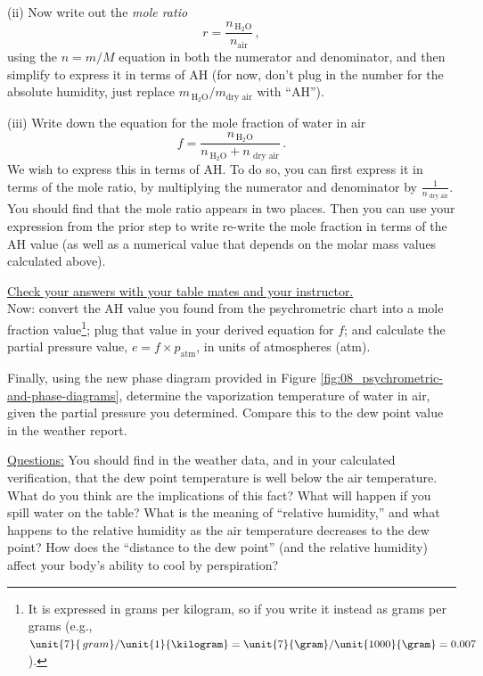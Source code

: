 \answerspace[6cm]

\noindent (ii) Now write out the {\em mole ratio}
	\begin{equation*}
	r = \frac{n_{\, \text{H}_2\text{O}}}{n_\text{air}} \, ,
	\end{equation*}
using the $n = m/M$ equation in both the numerator and denominator, and then simplify to express it in terms of AH (for now, don't plug in the number for the absolute humidity, just replace $m_{\, \text{H}_2\text{O}} / m_\text{dry air}$ with ``AH'').

\answerspace[6cm]

\noindent (iii) Write down the equation for the mole fraction of water in air
	\begin{equation*}
	f =  \frac{n_{\, \text{H}_2\text{O}}}{n_{\, \text{H}_2\text{O}} + n_\text{ dry air}} \,.
	\end{equation*}
We wish to express this in terms of AH.  To do so, you can first express it in terms of the mole ratio, by multiplying the numerator and denominator by $\frac{1}{n_\text{ dry air}}$. You should find that the mole ratio appears in two places.  Then you can use your expression from the prior step to write re-write the mole fraction in terms of the AH value (as well as a numerical value that depends on the molar mass values calculated above).

\answerspace[5cm]

\noindent \underline{Check your answers with your table mates and your instructor.} \\[-6pt]

\noindent Now: convert the AH value you found from the psychrometric chart into a mole fraction value\footnote{It is expressed in grams per kilogram, so if you write it instead as grams per grams (e.g., $\unit{7}{\,gram} / \unit{1}{\kilogram} = \unit{7}{\gram} / \unit{1000}{\gram} = 0.007$).}; plug that value in your derived equation for $f$; and calculate the partial pressure value, $e = f \times p_\text{atm}$, in units of atmospheres (atm).

\answerspace[4cm]

\noindent Finally, using the new phase diagram provided in Figure \ref{fig:08_psychrometric-and-phase-diagrams}, determine the vaporization temperature of water in air, given the partial pressure you determined.  Compare this to the dew point value in the weather report.

\answerspace[3cm]

\noindent  \underline{Questions:} You should find in the weather data, and in your calculated verification, that the dew point temperature is well below the air temperature.  What do you think are the implications of this fact?  What will happen if you spill water on the table?  What is the meaning of ``relative humidity,'' and what happens to the relative humidity as the air temperature decreases to the dew point?  How does the ``distance to the dew point'' (and the relative humidity) affect your body's ability to cool by perspiration?
	




